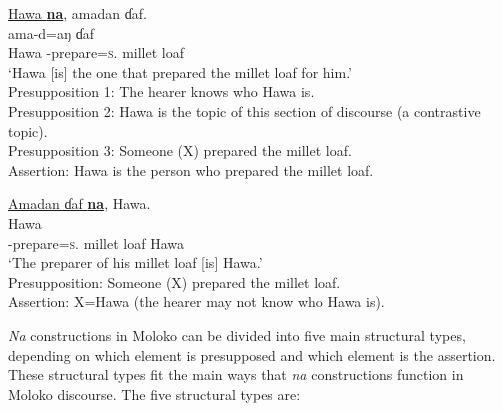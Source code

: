\ea \label{ex:11:10}
\underline{Hawa  \textbf{na}},  amadan  ɗaf.\\
\gll  {}    ama-d=aŋ    ɗaf\\
      Hawa  {\PSP}  {\DEP}-prepare=\textsc{s}.{\IO}  {millet loaf}\\
\glt  ‘Hawa [is] the one that prepared the millet loaf for him.’\\
  Presupposition 1:    The hearer knows who Hawa is.\\
Presupposition 2:    Hawa is the topic of this section of discourse (a contrastive topic).\\
  Presupposition 3:    Someone (X) prepared the millet loaf.\\
  Assertion:     Hawa is the person who prepared the millet loaf.
\z

\ea \label{ex:11:11}
\underline{Amadan  ɗaf  \textbf{na}},  Hawa.\\
\gll  {}          Hawa\\
     {\DEP}-prepare=\textsc{s}.{\IO}  {millet loaf}  {\PSP}  Hawa\\
\glt  ‘The preparer of his millet loaf [is] Hawa.’ \\
  Presupposition:     Someone (X) prepared the millet loaf.\\
  Assertion:     X=Hawa (the hearer may not know who Hawa is).  
\z

\textit{Na} constructions in Moloko can be divided into five main structural types, depending on which element is presupposed and which element is the assertion. These structural types fit the main ways that \textit{na} constructions function in Moloko discourse. The five structural types are: 


